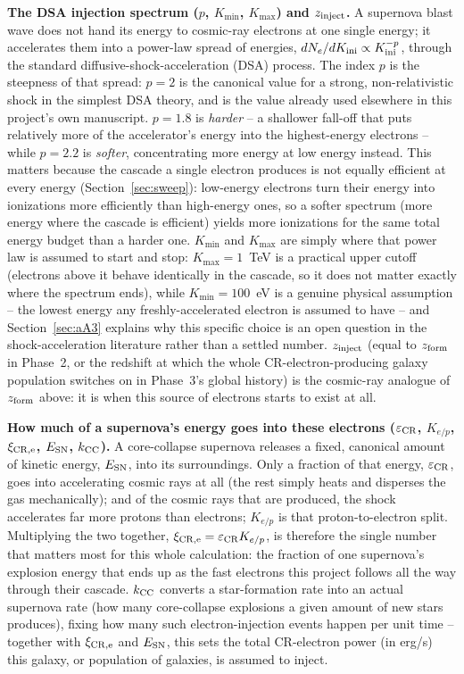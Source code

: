 \documentclass[11pt,a4paper]{article}
\newcommand{\Kini}{K_{\rm ini}}
\begin{document}
\textbf{The DSA injection spectrum ($p$, $K_{\min}$, $K_{\max}$) and $z_{\rm inject}$.} A
supernova blast wave does not hand its energy to cosmic-ray electrons at one single energy; it
accelerates them into a power-law spread of energies, $dN_e/d\Kini\propto \Kini^{-p}$, through
the standard diffusive-shock-acceleration (DSA) process. The index $p$ is the steepness of that
spread: $p=2$ is the canonical value for a strong, non-relativistic shock in the simplest
DSA theory, and is the value already used elsewhere in this project's own manuscript. $p=1.8$
is \emph{harder} -- a shallower fall-off that puts relatively more of the accelerator's energy
into the highest-energy electrons -- while $p=2.2$ is \emph{softer}, concentrating more energy
at low energy instead. This matters because the cascade a single electron produces is not
equally efficient at every energy (Section~\ref{sec:sweep}): low-energy electrons turn their
energy into ionizations more efficiently than high-energy ones, so a softer spectrum
(more energy where the cascade is efficient) yields more ionizations for the same total energy
budget than a harder one. $K_{\min}$ and $K_{\max}$ are simply where that power law is assumed
to start and stop: $K_{\max}=1$~TeV is a practical upper cutoff (electrons above it behave
identically in the cascade, so it does not matter exactly where the spectrum ends), while
$K_{\min}=100$~eV is a genuine physical assumption -- the lowest energy any freshly-accelerated
electron is assumed to have -- and Section~\ref{sec:aA3} explains why this specific choice is
an open question in the shock-acceleration literature rather than a settled number.
$z_{\rm inject}$ (equal to $z_{\rm form}$ in Phase~2, or the redshift at which the whole
CR-electron-producing galaxy population switches on in Phase~3's global history) is the
cosmic-ray analogue of $z_{\rm form}$ above: it is when this source of electrons starts to
exist at all.

\textbf{How much of a supernova's energy goes into these electrons ($\varepsilon_{\rm CR}$,
$K_{e/p}$, $\xi_{\rm CR,e}$, $E_{\rm SN}$, $k_{\rm CC}$).} A core-collapse supernova releases a
fixed, canonical amount of kinetic energy, $E_{\rm SN}$, into its surroundings. Only a
fraction of that energy, $\varepsilon_{\rm CR}$, goes into accelerating cosmic rays at all
(the rest simply heats and disperses the gas mechanically); and of the cosmic rays that are
produced, the shock accelerates far more protons than electrons; $K_{e/p}$ is that
proton-to-electron split. Multiplying the two together, $\xi_{\rm CR,e}=\varepsilon_{\rm
CR}K_{e/p}$, is therefore the single number that matters most for this whole calculation: the
fraction of one supernova's explosion energy that ends up as the fast electrons this project
follows all the way through their cascade. $k_{\rm CC}$ converts a star-formation rate into an
actual supernova rate (how many core-collapse explosions a given amount of new stars
produces), fixing how many such electron-injection events happen per unit time -- together
with $\xi_{\rm CR,e}$ and $E_{\rm SN}$, this sets the total CR-electron power (in erg/s) this
galaxy, or population of galaxies, is assumed to inject.
\end{document}

